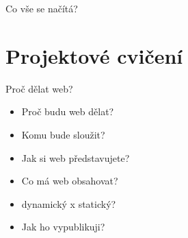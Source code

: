 \documentclass{beamer}
\begin{document}
\begin{frame}{Co vše se načítá?}
\end{frame}


\section{Projektové cvičení}

\begin{frame}{Proč dělat web?}
	\begin{itemize}
		\item Proč budu web dělat? 
		\item Komu bude sloužit?
		\item Jak si web představujete?
		\item Co má web obsahovat?
		\item dynamický x statický?
		\item Jak ho vypublikuji?
	\end{itemize}
\end{frame}
\end{document}
